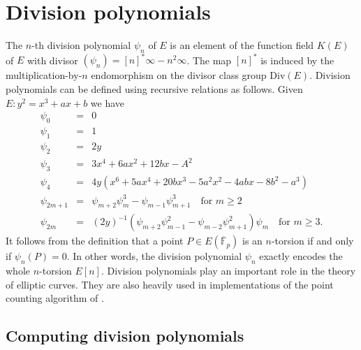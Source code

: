 \documentclass[12pt]{article}
\theoremstyle{plain}
\theoremstyle{definition}
\def\F{\ensuremath{\mathbb{F}}}
\begin{document}


\section{Division polynomials}
\label{sec:divpoly}

The $n$-th division polynomial $\psi_n$ of $E$ is an element of the function field $K(E)$ of $E$ 
with divisor $(\psi_n) = [n]^*\infty - n^2\infty$. The map $[n]^*$ is induced by the 
multiplication-by-$n$ endomorphism on the divisor class group $\text{Div}(E)$. Division polynomials 
can be defined using recursive relations as follows. Given $E: y^2 = x^3 + ax + b$ we have
\begin{equation}
\label{equ:divpoly1}
	\begin{array}{rll}
		\psi_0 & = & 0 \\
		\psi_1 & = & 1 \\
		\psi_2 & = & 2y \\
		\psi_3 & = & 3x^4 + 6ax^2 + 12bx - A^2 \\
		\psi_4 & = & 4y(x^6 + 5ax^4 + 20bx^3 - 5a^2x^2 - 4abx - 8b^2 - a^3) \\
		\psi_{2m + 1} & = & \psi_{m + 2}\psi_m^3 - \psi_{m - 1}\psi_{m + 1}^3 \quad \text{for } m 
		\ge 2 \\
		\psi_{2m} & = & (2y)^{-1}(\psi_{m + 2}\psi_{m - 1}^2 - \psi_{m - 2}\psi_{m + 1}^2)\psi_m 
		\quad \text{for } m \ge 3.
	\end{array}
\end{equation}
It follows from the definition that a point $P \in E(\overline{\F}_p)$ is an $n$-torsion if and 
only if $\psi_n(P) = 0$. In other words, the division polynomial $\psi_n$ exactly encodes the whole 
$n$-torsion $E[n]$. Division polynomials play an important role in the theory of elliptic 
curves. They are also heavily used in implementations of the point counting algorithm of 
\cite{schoof85}. 


\subsection{Computing division polynomials}
\end{document}
